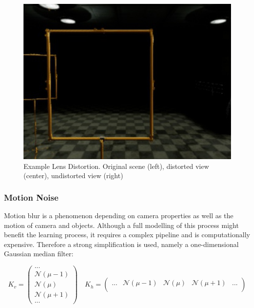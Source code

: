 \begin{figure}[htbp]
\begin{minipage}{0.33\textwidth}
	\includegraphics[width=\textwidth]{fig/gate_example_undistorted}
\end{minipage}
\caption{Example Lens Distortion. Original scene (left), distorted view (center), undistorted view (right)}
\label{fig:distortion}
\end{figure}

\subsubsection{Motion Noise}

Motion blur is a phenomenon depending on camera properties as well as the motion of camera and objects. Although a full modelling of this process might benefit the learning process, it requires a complex pipeline and is computationally expensive. Therefore a strong simplification is used, namely a one-dimensional Gaussian median filter:

\begin{equation}
K_v = \begin{pmatrix}
...				 \\
\mathcal{N}(\mu-1) \\
\mathcal{N}(\mu)  \\
\mathcal{N}(\mu+1)	 \\
	...					
\end{pmatrix} \quad
K_h = \begin{pmatrix}
...	& \mathcal{N}(\mu-1)	&	\mathcal{N}(\mu) &	\mathcal{N}(\mu+1) & ...\\
\end{pmatrix}
	\label{eq:motion_noise}
\end{equation}

